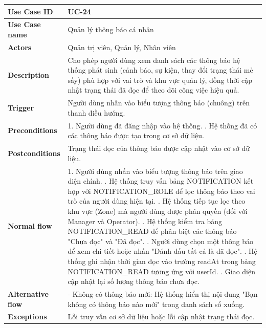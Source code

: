 \begin{tabular}{|p{3.5cm}|p{12cm}|}
\hline
\textbf{Use Case ID} & UC-24 \\
\hline
\textbf{Use Case name} & Quản lý thông báo cá nhân \\
\hline
\textbf{Actors} & Quản trị viên, Quản lý, Nhân viên \\
\hline
\textbf{Description} &
Cho phép người dùng xem danh sách các thông báo hệ thống phát sinh (cảnh báo, sự kiện, thay đổi trạng thái mẻ sấy) phù hợp với vai trò và khu vực quản lý, đồng thời cập nhật trạng thái đã đọc để theo dõi công việc hiệu quả. \\
\hline
\textbf{Trigger} &
Người dùng nhấn vào biểu tượng thông báo (chuông) trên thanh điều hướng. \\
\hline
\textbf{Preconditions} &
1. Người dùng đã đăng nhập vào hệ thống. \newline
2. Hệ thống đã có các thông báo được tạo trong cơ sở dữ liệu. \\
\hline
\textbf{Postconditions} &
Trạng thái đọc của thông báo được cập nhật vào cơ sở dữ liệu. \\
\hline
\textbf{Normal flow} &
1. Người dùng nhấn vào biểu tượng thông báo trên giao diện chính. \newline
2. Hệ thống truy vấn bảng NOTIFICATION kết hợp với NOTIFICATION\_ROLE để lọc thông báo theo vai trò của người dùng hiện tại. \newline
3. Hệ thống tiếp tục lọc theo khu vực (Zone) mà người dùng được phân quyền (đối với Manager và Operator). \newline
4. Hệ thống kiểm tra bảng NOTIFICATION\_READ để phân biệt các thông báo "Chưa đọc" và "Đã đọc". \newline
5. Người dùng chọn một thông báo để xem chi tiết hoặc nhấn "Đánh dấu tất cả là đã đọc". \newline
6. Hệ thống ghi nhận thời gian đọc vào trường readAt trong bảng NOTIFICATION\_READ tương ứng với userId. \newline
7. Giao diện cập nhật lại số lượng thông báo chưa đọc. \\
\hline
\textbf{Alternative flow} &
- Không có thông báo mới: Hệ thống hiển thị nội dung "Bạn không có thông báo nào mới" trong danh sách sổ xuống. \\
\hline
\textbf{Exceptions} &
Lỗi truy vấn cơ sở dữ liệu hoặc lỗi cập nhật trạng thái đọc. \\
\hline
\end{tabular}